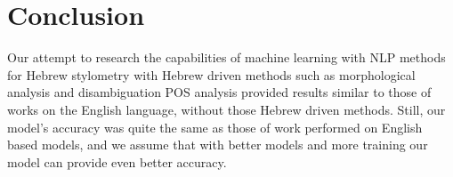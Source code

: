 \documentclass[a4paper]{article}
\begin{document}

\section{Conclusion}
\label{Conclusion}

Our attempt to research the capabilities of machine learning with NLP methods for Hebrew stylometry with Hebrew driven methods such as morphological analysis and disambiguation POS analysis provided results similar to those of works on the English language, without those Hebrew driven methods.
Still, our model's accuracy was quite the same as those of work performed on English based models, and we assume that with better models and more training our model can provide even better accuracy.

%
\end{document}
